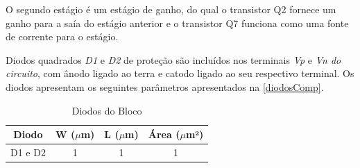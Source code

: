O segundo est\'agio \'e um est\'agio de ganho, do qual o transistor Q2 fornece um ganho para a saía do est\'agio anterior e o transistor Q7 funciona como uma fonte de corrente para o est\'agio.

Diodos quadrados \textit{D1} e \textit{D2} de proteção são inclu\'idos nos terminais \textit{Vp} e \textit{Vn do circuito}, com \^anodo ligado ao terra e catodo ligado ao seu respectivo terminal. Os diodos apresentam os seguintes par\^ametros apresentados na \autoref{diodosComp}.

\begin{table}[!h]
\caption{Diodos do Bloco \NomeBloco}
\label{diodosComp}
\centering
\begin{tabular}{cccc}
\toprule
Diodo & W ($\mu$m)  & L ($\mu$m)           & \'Area ($\mu$m²)\\
\midrule \midrule
D1 e D2 & 1 & 1 & 1 \\

\bottomrule
\end{tabular}
\end{table}

